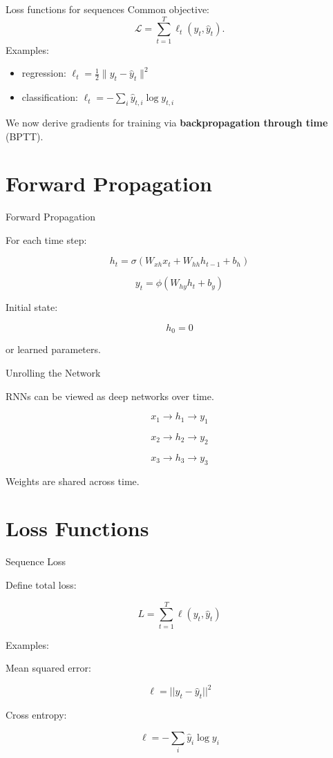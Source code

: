 \documentclass{beamer}
\begin{document}
\begin{frame}{Loss functions for sequences}
Common objective:
\[
\mathcal{L} = \sum_{t=1}^T \ell_t(y_t,\hat y_t).
\]
Examples:
\begin{itemize}
\item regression: \(\ell_t=\frac12\|y_t-\hat y_t\|^2\)
\item classification: \(\ell_t=-\sum_i \hat y_{t,i}\log y_{t,i}\)
\end{itemize}
We now derive gradients for training via \textbf{backpropagation through time} (BPTT).
\end{frame}



\section{Forward Propagation}

\begin{frame}{Forward Propagation}

For each time step:

\[
h_t = \sigma(W_{xh}x_t + W_{hh}h_{t-1} + b_h)
\]

\[
y_t = \phi(W_{hy}h_t + b_y)
\]

Initial state:

\[
h_0 = 0
\]

or learned parameters.
\end{frame}

\begin{frame}{Unrolling the Network}

RNNs can be viewed as deep networks over time.

\[
x_1 \rightarrow h_1 \rightarrow y_1
\]

\[
x_2 \rightarrow h_2 \rightarrow y_2
\]

\[
x_3 \rightarrow h_3 \rightarrow y_3
\]

Weights are shared across time.
\end{frame}

\section{Loss Functions}

\begin{frame}{Sequence Loss}

Define total loss:

\[
L = \sum_{t=1}^{T} \ell(y_t,\hat y_t)
\]

Examples:

Mean squared error:

\[
\ell = ||y_t-\hat y_t||^2
\]

Cross entropy:

\[
\ell = - \sum_i \hat y_i \log y_i
\]
\end{frame}
\end{document}
